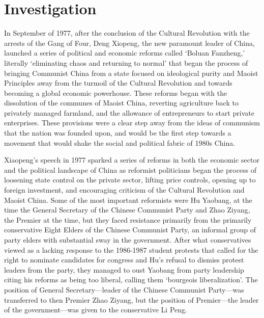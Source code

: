 \documentclass{paper}
\begin{document}
\section{Investigation}
\begin{doublespace}
In September of 1977, after the conclusion of the Cultural Revolution with the arrests of the Gang of Four, Deng Xiopeng, the new paramount leader of China, launched a series of political and economic reforms called ‘Boluan Fanzheng,’ literally ‘eliminating chaos and returning to normal’ that began the process of bringing Communist China from a state focused on ideological purity and Maoist Principles away from the turmoil of the Cultural Revolution and towards becoming a global economic powerhouse. These reforms began with the dissolution of the communes of Maoist China, reverting agriculture back to privately managed farmland, and the allowance of entrepreneurs to start private enterprises. These provisions were a clear step away from the ideas of communism that the nation was founded upon, and would be the first step towards a movement that would shake the social and political fabric of 1980s China.

Xiaopeng’s speech in 1977 sparked a series of reforms in both the economic sector and the political landscape of China as reformist politicians began the process of loosening state control on the private sector, lifting price controls, opening up to foreign investment, and encouraging criticism of the Cultural Revolution and Maoist China. Some of the most important reformists were Hu Yaobang, at the time the General Secretary of the Chinese Communist Party and Zhao Ziyang, the Premier at the time, but they faced resistance primarily from the primarily conservative Eight Elders of the Chinese Communist Party, an informal group of party elders with substantial sway in the government. After what conservatives viewed as a lacking response to the 1986-1987 student protests that called for the right to nominate candidates for congress and Hu’s refusal to dismiss protest leaders from the party, they managed to oust Yaobang from party leadership citing his reforms as being too liberal, calling them ‘bourgeois liberalization’. The position of General Secretary---leader of the Chinese Communist Party---was transferred to then Premier Zhao Ziyang, but the position of Premier---the leader of the government---was given to the conservative Li Peng.


\end{doublespace}
\end{document}
